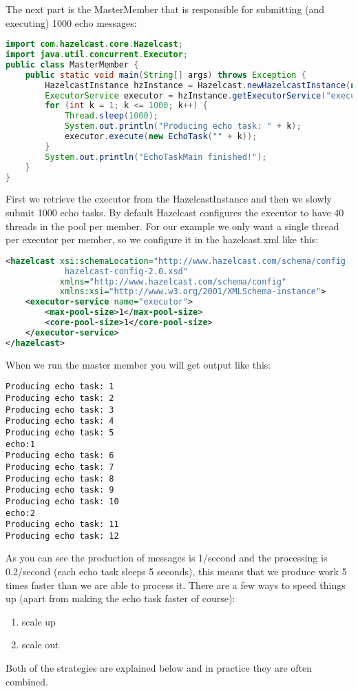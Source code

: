 The next part is the MasterMember that is responsible for submitting (and executing) 1000 echo messages:
\begin{lstlisting}[language=java]
import com.hazelcast.core.Hazelcast;
import java.util.concurrent.Executor;
public class MasterMember {
    public static void main(String[] args) throws Exception {
        HazelcastInstance hzInstance = Hazelcast.newHazelcastInstance(null);
        ExecutorService executor = hzInstance.getExecutorService("executor");
        for (int k = 1; k <= 1000; k++) {
            Thread.sleep(1000);
            System.out.println("Producing echo task: " + k);
            executor.execute(new EchoTask("" + k));
        }
        System.out.println("EchoTaskMain finished!");
    }
}
\end{lstlisting}
First we retrieve the executor from the HazelcastInstance and then we slowly submit 1000 echo tasks. By default Hazelcast configures the executor to have 40 threads in the pool per member. For our example we only want a single thread per executor per member, so we configure it in the hazelcast.xml like this:
\begin{lstlisting}[language=xml]
<hazelcast xsi:schemaLocation="http://www.hazelcast.com/schema/config
            hazelcast-config-2.0.xsd"
           xmlns="http://www.hazelcast.com/schema/config"
           xmlns:xsi="http://www.w3.org/2001/XMLSchema-instance">
    <executor-service name="executor">
        <max-pool-size>1</max-pool-size>
        <core-pool-size>1</core-pool-size>
    </executor-service>
</hazelcast>
\end{lstlisting}

When we run the master member you will get output like this:
\begin{lstlisting}
Producing echo task: 1
Producing echo task: 2
Producing echo task: 3
Producing echo task: 4
Producing echo task: 5
echo:1
Producing echo task: 6
Producing echo task: 7
Producing echo task: 8
Producing echo task: 9
Producing echo task: 10
echo:2
Producing echo task: 11
Producing echo task: 12	
\end{lstlisting}
As you can see the production of messages is 1/second and the processing is 0.2/second (each echo task sleeps 5 seconds), this means that we produce work 5 times faster than we are able to process it. There are a few ways to speed things up (apart from making the echo task faster of course):
\begin{enumerate}
\item scale up 
\item scale out
\end{enumerate}
Both of the strategies are explained below and in practice they are often combined. 

